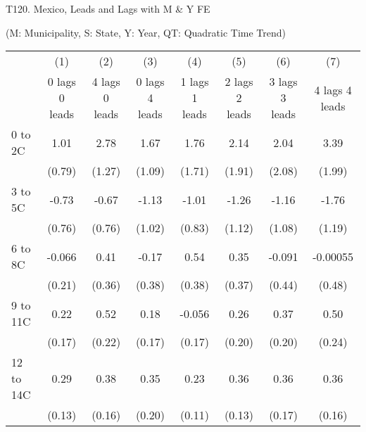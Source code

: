 \documentclass[paper=letterpaper, fontsize=11pt]{article} %
\begin{document}
{\begin{landscape}

\small

\begin{center}
T120. Mexico, Leads and Lags with M \& Y FE

(M: Municipality, S: State, Y: Year, QT: Quadratic Time Trend)
\end{center}

\begin{longtable}{l*{7}{c}} \hline\hline\endfirsthead\hline\endhead\hline\endfoot\endlastfoot
                    &\multicolumn{1}{c}{(1)}&\multicolumn{1}{c}{(2)}&\multicolumn{1}{c}{(3)}&\multicolumn{1}{c}{(4)}&\multicolumn{1}{c}{(5)}&\multicolumn{1}{c}{(6)}&\multicolumn{1}{c}{(7)}\\
                    &\multicolumn{1}{c}{0 lags 0 leads}&\multicolumn{1}{c}{4 lags 0 leads}&\multicolumn{1}{c}{0 lags 4 leads}&\multicolumn{1}{c}{1 lags 1 leads}&\multicolumn{1}{c}{2 lags 2 leads}&\multicolumn{1}{c}{3 lags 3 leads}&\multicolumn{1}{c}{4 lags 4 leads}\\
\hline
0 to 2C             &        1.01&        2.78&        1.67&        1.76&        2.14&        2.04&        3.39\\
                    &      (0.79)&      (1.27)&      (1.09)&      (1.71)&      (1.91)&      (2.08)&      (1.99)\\
3 to 5C             &       -0.73&       -0.67&       -1.13&       -1.01&       -1.26&       -1.16&       -1.76\\
                    &      (0.76)&      (0.76)&      (1.02)&      (0.83)&      (1.12)&      (1.08)&      (1.19)\\
6 to 8C             &      -0.066&        0.41&       -0.17&        0.54&        0.35&      -0.091&    -0.00055\\
                    &      (0.21)&      (0.36)&      (0.38)&      (0.38)&      (0.37)&      (0.44)&      (0.48)\\
9 to 11C            &        0.22&        0.52&        0.18&      -0.056&        0.26&        0.37&        0.50\\
                    &      (0.17)&      (0.22)&      (0.17)&      (0.17)&      (0.20)&      (0.20)&      (0.24)\\
12 to 14C           &        0.29&        0.38&        0.35&        0.23&        0.36&        0.36&        0.36\\
                    &      (0.13)&      (0.16)&      (0.20)&      (0.11)&      (0.13)&      (0.17)&      (0.16)\\

\end{longtable}
\end{landscape}}
\end{document}
